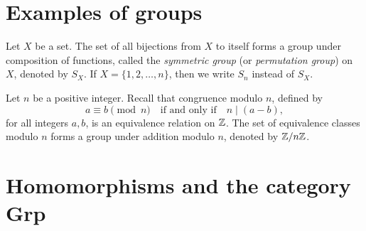\section{Examples of groups}

\begin{definition}
    Let \(X\) be a set. The set of all bijections from \(X\) to itself forms a
    group under composition of functions, called the \emph{symmetric group} (or
    \emph{permutation group}) on \(X\), denoted by \(S_X\). If \(X = \{1, 2,
    \ldots, n\}\), then we write \(S_n\) instead of \(S_X\).
\end{definition}


\begin{definition}
    \label{def:zmodn}
    Let \(n\) be a positive integer. Recall that congruence modulo \(n\),
    defined by
    \[
        a \equiv b \pmod{n} \quad \text{if and only if} \quad n \mid (a - b),
    \]
    for all integers \(a, b\), is an equivalence relation on \(\mathbb{Z}\). The set of
    equivalence classes modulo \(n\) forms a group under addition modulo \(n\),
    denoted by \(\mathbb{Z}/n\mathbb{Z}\).
\end{definition}

\section{Homomorphisms and the category {\normalfont\sffamily Grp}}

